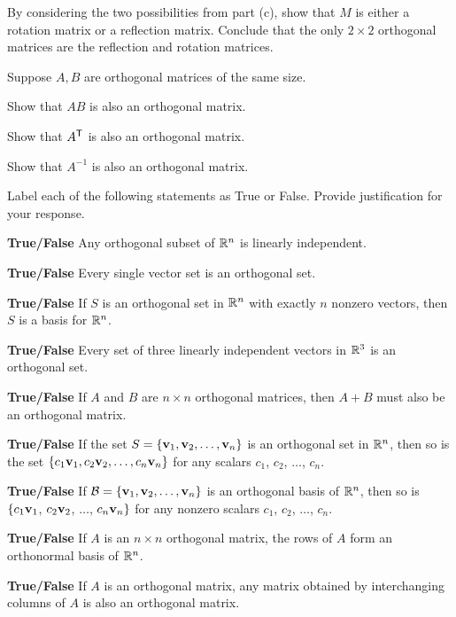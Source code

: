 \item By considering the two possibilities from part (c), show that $M$ is either a rotation matrix or a reflection matrix. Conclude that the only $2 \times 2$ orthogonal matrices are the reflection and rotation matrices. 

\ea 
	

\item Suppose $A, B$ are orthogonal matrices of the same size. 
  \ba 
	\item Show that $AB$ is also an orthogonal matrix.
	\item Show that $A^{\mathsf{T}}$ is also an orthogonal matrix.
	\item Show that $A^{-1}$ is also an orthogonal matrix.
	\ea
	
\item Label each of the following statements as True or False. Provide justification for your response.
	\ba
	\item \textbf{True/False} Any orthogonal subset of $\mathbb{R}^n$ is linearly independent.
	\item \textbf{True/False} Every single vector set is an orthogonal set.
	\item \textbf{True/False} If $S$ is an orthogonal set in $\mathbb{R}^n$ with exactly $n$ nonzero vectors, then $S$ is a basis for $\mathbb{R}^n$.  
	\item \textbf{True/False} Every set of three linearly independent vectors in $\mathbb{R}^3$ is an orthogonal set.
	\item \textbf{True/False} If $A$ and $B$ are $n \times n$ orthogonal matrices, then $A+B$ must also be an orthogonal matrix.
	\item \textbf{True/False} If the set $S=\{\mathbf{v}_1, \mathbf{v}_2, \ldots, \mathbf{v}_n\}$ is an orthogonal set in $\mathbb{R}^n$, then so is the set $\{c_1\mathbf{v}_1, c_2\mathbf{v}_2, \ldots, c_n\mathbf{v}_n\}$ for any scalars $c_1$, $c_2$, $\ldots$, $c_n$.
	\item \textbf{True/False} If $\mathcal{B}=\{\mathbf{v}_1, \mathbf{v}_2, \ldots, \mathbf{v}_n\}$ is an orthogonal basis of $\mathbb{R}^n$, then so is $\{c_1\mathbf{v}_1$, $c_2\mathbf{v}_2$, $\ldots$, $c_n\mathbf{v}_n\}$ for any nonzero scalars $c_1$, $c_2$, $\ldots$, $c_n$.
	\item \textbf{True/False} If $A$ is an $n\times n$ orthogonal matrix, the rows of $A$ form an orthonormal basis of $\mathbb{R}^n$.
	\item \textbf{True/False} If $A$ is an orthogonal matrix, any matrix obtained by interchanging columns of $A$ is also an orthogonal matrix.
	\ea
	
